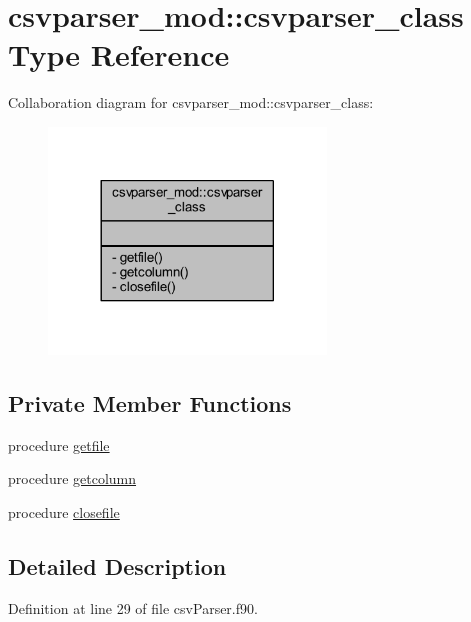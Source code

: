\hypertarget{structcsvparser__mod_1_1csvparser__class}{}\section{csvparser\+\_\+mod\+:\+:csvparser\+\_\+class Type Reference}
\label{structcsvparser__mod_1_1csvparser__class}


Collaboration diagram for csvparser\+\_\+mod\+:\+:csvparser\+\_\+class\+:\nopagebreak
\begin{figure}[H]
\begin{center}
\leavevmode
\includegraphics[width=209pt]{structcsvparser__mod_1_1csvparser__class__coll__graph}
\end{center}
\end{figure}
\subsection*{Private Member Functions}
\begin{DoxyCompactItemize}
\item 
procedure \mbox{\hyperlink{structcsvparser__mod_1_1csvparser__class_ac81d9b3ae0e228bc9e0005b0f59246dd}{getfile}}
\item 
procedure \mbox{\hyperlink{structcsvparser__mod_1_1csvparser__class_a5181391410574d31ea7ed93091f2d21a}{getcolumn}}
\item 
procedure \mbox{\hyperlink{structcsvparser__mod_1_1csvparser__class_a1daa0b05831e325af862044831d5aade}{closefile}}
\end{DoxyCompactItemize}


\subsection{Detailed Description}


Definition at line 29 of file csv\+Parser.\+f90.



